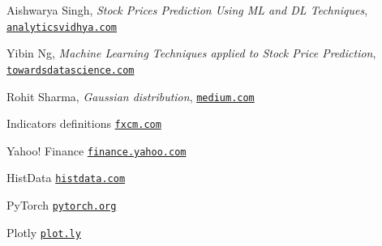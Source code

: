 \documentclass[a4paper,12pt]{article}
\begin{document}
\pagebreak
\begin{thebibliography}{15}
	
Aishwarya Singh, \textit{Stock Prices Prediction Using ML and DL Techniques},
\texttt{\href{https://www.analyticsvidhya.com/blog/2018/10/predicting-stock-price-machine-learningnd-deep-learning-techniques-python/}{analyticsvidhya.com}}

Yibin Ng, \textit{Machine Learning Techniques applied to Stock Price Prediction}, \texttt{\href{https://towardsdatascience.com/machine-learning-techniques-applied-to-stock-price-prediction-6c1994da8001}{towardsdatascience.com}}

Rohit Sharma, \textit{Gaussian distribution}, \texttt{\href{https://medium.com/ai-techsystems/gaussian-distribution-why-is-it-important-in-data-science-and-machine-learning-9adbe0e5f8ac}{medium.com}}


Indicators definitions
\texttt{\href{https://www.fxcm.com/uk/insights/learn-forex-oscillators-and-momentum-indicators/}{fxcm.com}}

Yahoo! Finance
\texttt{\href{https://finance.yahoo.com}{finance.yahoo.com}}

HistData
\texttt{\href{http://histdata.com}{histdata.com}}

PyTorch
\texttt{\href{https://pytorch.org/}{pytorch.org}}

Plotly
\texttt{\href{https://plot.ly/javascript/}{plot.ly}}

\end{thebibliography}
\end{document}
